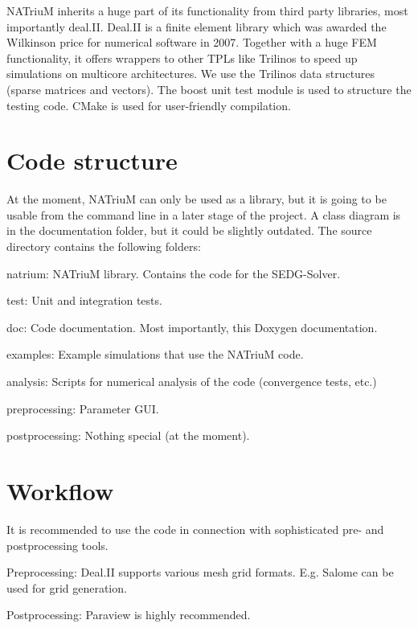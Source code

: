 NATriuM inherits a huge part of its functionality from third party libraries, most importantly deal.II. Deal.II is a finite element library which was awarded the Wilkinson price for numerical software in 2007. Together with a huge FEM functionality, it offers wrappers to other TPLs like Trilinos to speed up simulations on multicore architectures. We use the Trilinos data structures (sparse matrices and vectors). The boost unit test module is used to structure the testing code. CMake is used for user-\/friendly compilation.\hypertarget{index_struct_sec}{}\section{Code structure}\label{index_struct_sec}
At the moment, NATriuM can only be used as a library, but it is going to be usable from the command line in a later stage of the project. A class diagram is in the documentation folder, but it could be slightly outdated. The source directory contains the following folders:
\begin{DoxyItemize}
\item natrium: NATriuM library. Contains the code for the SEDG-\/Solver.
\item test: Unit and integration tests.
\item doc: Code documentation. Most importantly, this Doxygen documentation.
\item examples: Example simulations that use the NATriuM code.
\item analysis: Scripts for numerical analysis of the code (convergence tests, etc.)
\item preprocessing: Parameter GUI.
\item postprocessing: Nothing special (at the moment).
\end{DoxyItemize}\hypertarget{index_workflow_sec}{}\section{Workflow}\label{index_workflow_sec}
It is recommended to use the code in connection with sophisticated pre-\/ and postprocessing tools.
\begin{DoxyItemize}
\item Preprocessing: Deal.II supports various mesh grid formats. E.g. Salome can be used for grid generation.
\item Postprocessing: Paraview is highly recommended.
\end{DoxyItemize}


